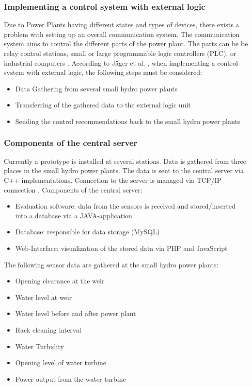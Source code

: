\subsubsection{Implementing a control system with external logic}
Due to Power Plants having different states and types of devices, there exists a problem with setting up an overall communication system. The communication system aims to control the different parts of the power plant. The parts can be be relay control stations, small or large programmable logic controllers (PLC), or industrial computers \cite{SEIT2017}.
According to Jäger et al. \cite{SEIT2017}, when implementing a control system with external logic, the following steps must be considered:
\begin{itemize}
	\item Data Gathering from several small hydro power plants
	\item Transferring of the gathered data to the external logic unit
	\item Sending the control recommendations back to the small hydro power plants
\end{itemize}
\subsubsection{Components of the central server}
Currently a prototype is installed at several stations. Data is gathered from three places in the small hydro
power plants. The data is sent to the central server via C++ implementations. Connection to the server is managed via TCP/IP connection \cite{SEIT2017}. Components of the central server:
\begin{itemize}
	\item Evaluation software: data from the sensors is received and stored/inserted into a database via a JAVA-application
	\item Database: responsible for data storage (MySQL)
	\item Web-Interface: visualization of the stored data via PHP and JavaScript
\end{itemize}
The following sensor data are gathered at the small hydro power plants:
\begin{itemize}
	\item Opening clearance at the weir
	\item Water level at weir
	\item Water level before and after power plant
	\item Rack cleaning interval
	\item Water Turbidity
	\item Opening level of water turbine
	\item Power output from the water turbine
\end{itemize}
